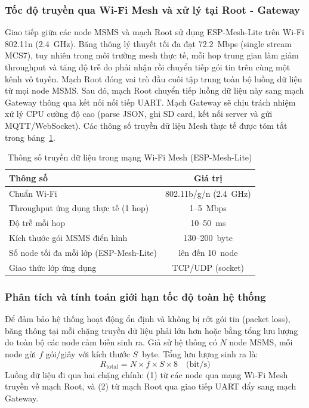 \documentclass{article} %
\begin{document}
\subsubsection{Tốc độ truyền qua Wi-Fi Mesh và xử lý tại Root - Gateway}
Giao tiếp giữa các node MSMS và mạch Root sử dụng ESP-Mesh-Lite trên Wi-Fi 802.11n (2.4~GHz). Băng thông lý thuyết tối đa đạt 72.2~Mbps (single stream MCS7), tuy nhiên trong môi trường mesh thực tế, mỗi hop trung gian làm giảm throughput và tăng độ trễ do phải nhận rồi chuyển tiếp gói tin trên cùng một kênh vô tuyến. Mạch Root đóng vai trò đầu cuối tập trung toàn bộ luồng dữ liệu từ mọi node MSMS. Sau đó, mạch Root chuyển tiếp luồng dữ liệu này sang mạch Gateway thông qua kết nối nối tiếp UART. Mạch Gateway sẽ chịu trách nhiệm xử lý CPU cường độ cao (parse JSON, ghi SD card, kết nối server và gửi MQTT/WebSocket). Các thông số truyền dữ liệu Mesh thực tế được tóm tắt trong bảng~\ref{tab:mesh_rate}.
\begin{table}[H]
    \centering
    \caption{Thông số truyền dữ liệu trong mạng Wi-Fi Mesh (ESP-Mesh-Lite)}
    \label{tab:mesh_rate}
    \renewcommand{\arraystretch}{1.3}
    \begin{tabular}{|l|c|}
    \hline
    \textbf{Thông số} & \textbf{Giá trị} \\
    \hline
    Chuẩn Wi-Fi & 802.11b/g/n (2.4~GHz) \\
    Throughput ứng dụng thực tế (1 hop) & 1--5~Mbps \\
    Độ trễ mỗi hop & 10--50~ms \\
    Kích thước gói MSMS điển hình & 130--200~byte \\
    Số node tối đa mỗi lớp (ESP-Mesh-Lite) & lên đến 10~node \\
    Giao thức lớp ứng dụng & TCP/UDP (socket) \\
    \hline
    \end{tabular}
\end{table}
\subsubsection{Phân tích và tính toán giới hạn tốc độ toàn hệ thống}
Để đảm bảo hệ thống hoạt động ổn định và không bị rớt gói tin (packet loss), băng thông tại mỗi chặng truyền dữ liệu phải lớn hơn hoặc bằng tổng lưu lượng do toàn bộ các node cảm biến sinh ra. Giả sử hệ thống có $N$ node MSMS, mỗi node gửi $f$ gói/giây với kích thước $S$~byte. Tổng lưu lượng sinh ra là:
\[
R_{\text{total}} = N \times f \times S \times 8 \quad \text{(bit/s)}
\]
Luồng dữ liệu đi qua hai chặng chính: (1) từ các node qua mạng Wi-Fi Mesh truyền về mạch Root, và (2) từ mạch Root qua giao tiếp UART đẩy sang mạch Gateway.
\end{document}
